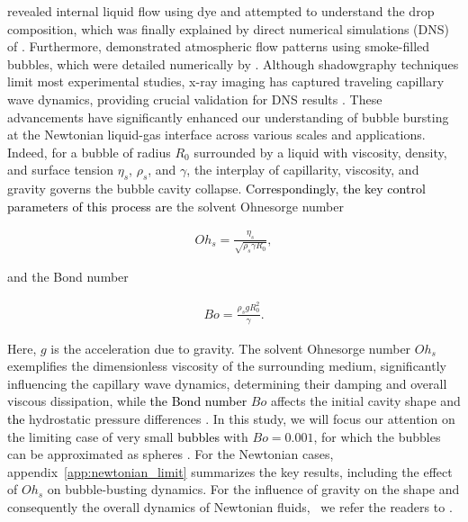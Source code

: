 \documentclass{jfm}
\newcommand{\DL}[1]{{\textcolor{black}{#1}}}
\newcommand{\oo}{\color{black} \normalfont}
\newcommand{\bb}{\color{black} \normalfont}
\begin{document}
\citet{macintyre1972flow} revealed internal liquid flow using dye and attempted to understand the drop composition, which was finally explained by direct numerical simulations (DNS) of \citet{dubitsky2023enrichment}.
Furthermore, \citet{dasouqi2022effect} demonstrated atmospheric flow patterns using smoke-filled bubbles, which were detailed numerically by \citet{singh2021dynamics}.
Although shadowgraphy techniques limit most experimental studies, x-ray imaging has captured traveling capillary wave dynamics, providing crucial validation for DNS results \citep{lee2011size}. These advancements have significantly enhanced our understanding of bubble bursting at the Newtonian liquid-gas interface across various scales and applications.
Indeed, for a bubble of radius $R_0$ surrounded by a liquid with viscosity, density, and surface tension $\eta_s$, $\rho_s$, and $\gamma$, the interplay of capillarity, viscosity, and gravity governs the bubble cavity collapse. \DL{Correspondingly, the key control parameters of this process are} the solvent Ohnesorge number

\begin{align}
	\label{eq:Ohdef}
	Oh_s = \frac{\eta_s}{\sqrt{\rho_s\gamma R_0}},
\end{align}

\noindent and the Bond number

\begin{align}
	\label{eq:Bodef}
	Bo = \frac{\rho_sgR_0^2}{\gamma}.
\end{align}

\noindent Here, $g$ is the acceleration due to gravity. The solvent Ohnesorge number $Oh_s$ exemplifies the dimensionless viscosity of the surrounding medium, significantly influencing the capillary wave dynamics, determining their damping and overall viscous dissipation, while \DL{the Bond number} $Bo$ affects the initial cavity shape and \DL{the} hydrostatic pressure differences \citep{walls2015jet,bergmann2006giant,bergmann2009controlled,Lohse2018}. In this study, we will focus our attention on the limiting case of very small \DL{bubbles} with $Bo = 0.001$, for which the bubbles can be approximated as spheres \citep[figures~\ref{schematic}a,][]{toba1959drop,princen1963shape,lhuissier2012bursting}.
For the Newtonian cases, appendix~\ref{app:newtonian_limit} summarizes the key results, including the effect of $Oh_s$ on bubble-busting dynamics. For the influence of gravity on the shape and consequently the overall dynamics of \oo Newtonian fluids,\bb\, we refer the readers to \citet{toba1959drop,princen1963shape,walls2015jet,krishnan2017scaling,deike2018dynamics}.
\end{document}
